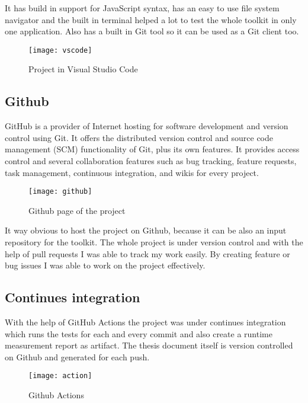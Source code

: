 It has build in support for JavaScript syntax, has an easy to use file system navigator and the built in terminal helped a lot to test the whole toolkit in only one application. Also has a built in Git tool so it can be used as a Git client too.

\begin{figure}[H]
	\centering
	\texttt{[image: vscode]}
	\caption{Project in Visual Studio Code}
	\label{fig:fig-studio}
\end{figure}

\newpage
\subsection{Github}

GitHub is a provider of Internet hosting for software development and version control using Git. It offers the distributed version control and source code management (SCM) functionality of Git, plus its own features. It provides access control and several collaboration features such as bug tracking, feature requests, task management, continuous integration, and wikis for every project.\cite{gitbib}

\begin{figure}[H]
	\centering
	\texttt{[image: github]}
	\caption{Github page of the project}
	\label{fig:fig-github}
\end{figure}

It way obvious to host the project on Github, because it can be also an input repository for the toolkit. The whole project is under version control and with the help of pull requests I was able to track my work easily. By creating feature or bug issues I was able to work on the project effectively.

\newpage
\subsection{Continues integration}

With the help of GitHub Actions the project was under continues integration which runs the tests for each and every commit and also create a runtime measurement report as artifact. 
The thesis document itself is version controlled on Github and generated for each push. 

\begin{figure}[H]
	\centering
	\texttt{[image: action]}
	\caption{Github Actions}
	\label{fig:fig-act}
\end{figure}


